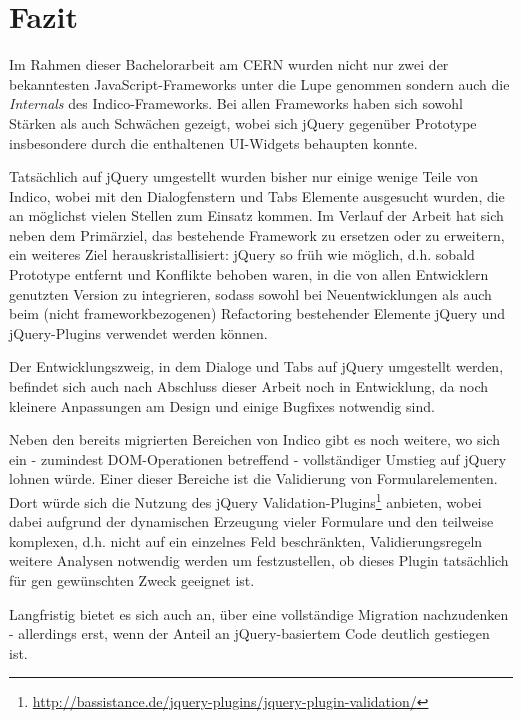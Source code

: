 \chapter{Fazit}

Im Rahmen dieser Bachelorarbeit am CERN wurden nicht nur zwei der bekanntesten JavaScript-Frameworks
unter die Lupe genommen sondern auch die \emph{Internals} des Indico-Frameworks. Bei allen
Frameworks haben sich sowohl Stärken als auch Schwächen gezeigt, wobei sich jQuery gegenüber
Prototype insbesondere durch die enthaltenen UI-Widgets behaupten konnte.

Tatsächlich auf jQuery umgestellt wurden bisher nur einige wenige Teile von Indico, wobei mit den
Dialogfenstern und Tabs Elemente ausgesucht wurden, die an möglichst vielen Stellen zum Einsatz
kommen. Im Verlauf der Arbeit hat sich neben dem Primärziel, das bestehende Framework zu ersetzen oder zu
erweitern, ein weiteres Ziel herauskristallisiert: jQuery so früh wie möglich, d.h. sobald Prototype
entfernt und Konflikte behoben waren, in die von allen Entwicklern genutzten Version zu integrieren,
sodass sowohl bei Neuentwicklungen als auch beim (nicht frameworkbezogenen) Refactoring bestehender
Elemente jQuery und jQuery-Plugins verwendet werden können.

Der Entwicklungszweig, in dem Dialoge und Tabs auf jQuery umgestellt werden, befindet sich auch nach
Abschluss dieser Arbeit noch in Entwicklung, da noch kleinere Anpassungen am Design und einige
Bugfixes notwendig sind.

Neben den bereits migrierten Bereichen von Indico gibt es noch weitere, wo sich ein - zumindest
DOM-Operationen betreffend - vollständiger Umstieg auf jQuery lohnen würde. Einer dieser Bereiche
ist die Validierung von Formularelementen. Dort würde sich die Nutzung des jQuery
Validation-Plugins\footnote{\href{http://bassistance.de/jquery-plugins/jquery-plugin-validation/}{http://bassistance.de/jquery-plugins/jquery-plugin-validation/}}
anbieten, wobei dabei aufgrund der dynamischen Erzeugung vieler Formulare und den teilweise
komplexen, d.h. nicht auf ein einzelnes Feld beschränkten, Validierungsregeln weitere Analysen
notwendig werden um festzustellen, ob dieses Plugin tatsächlich für gen gewünschten Zweck geeignet
ist.

Langfristig bietet es sich auch an, über eine vollständige Migration nachzudenken - allerdings erst,
wenn der Anteil an jQuery-basiertem Code deutlich gestiegen ist.

